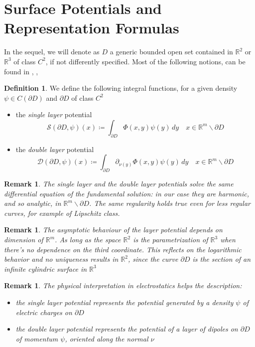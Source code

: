 \documentclass[10pt, a4paper, twoside, openright]{book}
\theoremstyle{definition}
\newtheorem{definition}[subsection]{Definition}
\theoremstyle{plain}
\theoremstyle{plain}
\theoremstyle{plain}
\theoremstyle{plain}
\newtheorem{remark}[subsection]{Remark}
\theoremstyle{plain}
\theoremstyle{plain}
\theoremstyle{plain}
\theoremstyle{plain}
\begin{document}
\section{Surface Potentials and Representation Formulas}
In the sequel, we will denote as $D$ a generic bounded open set contained in $\mathbb{R}^2$ or $\mathbb{R}^3$ of class $C^2$, if not differently specified.
Most of the following notions, can be found in \cite{kirsch:book}, \cite{colton-kress:book}, \cite{salsa:book}
\begin{definition}
 We define the following integral functions, for a given density $\psi\in C(\partial D)$ and $\partial D$ of class $C^2$
 \begin{itemize}
  \item the \emph{single layer} potential
   \begin{equation}
    \mathcal{S}(\partial D,\psi)(x)\coloneqq \int_{\partial D} \Phi(x, y)\psi(y)\, dy\quad x\in\mathbb{R}^m \backslash\partial D 
   \end{equation}
  \item the \emph{double layer} potential
   \begin{equation}
    \mathcal{D}(\partial D,\psi)(x)\coloneqq \int_{\partial D} \partial_{\nu(y)}\Phi(x, y)\psi(y)\, dy\quad x\in\mathbb{R}^m \backslash\partial D 
   \end{equation}
 \end{itemize}
\end{definition}
\begin{remark}
The single layer and the double layer potentials solve the same differential equation of the fundamental solution: in our case they are harmonic, and so analytic, in $\mathbb{R}^m\backslash \partial D$. The same regularity holds true even for less regular curves, for example of Lipschitz class.
\end{remark}
\begin{remark}
\label{rem:dimension}
The asymptotic behaviour of the layer potential depends on dimension of $\mathbb{R}^m$.
As long as the space $\mathbb{R}^2$ is the parametrization of $\mathbb{R}^3$ when there's no dependence on the third coordinate. This reflects on the logarithmic behavior and no uniqueness results in $\mathbb{R}^2$, since the curve $\partial D$ is the section of an infinite cylindric surface in $\mathbb{R}^3$ 
\end{remark}
\begin{remark}
The physical interpretation in electrostatics helps the description:
\begin{itemize}
 \item the single layer potential represents the potential generated by a density $\psi$ of electric charges on $\partial D$
 \item the double layer potential represents the potential of a layer of dipoles on $\partial D$ of momentum $\psi$, oriented along the normal $\nu$
\end{itemize}
\end{remark}
\end{document}
